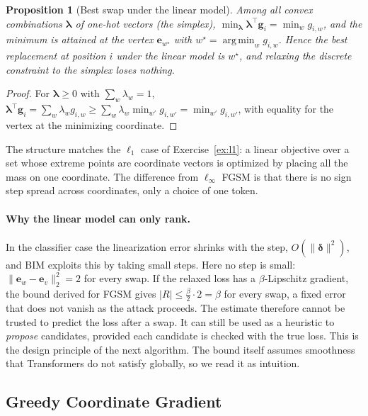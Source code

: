 \documentclass[10pt,a4paper]{extarticle}
\newtheorem{proposition}[theorem]{Proposition}
\theoremstyle{definition}
\newcommand{\bdelta}{\boldsymbol{\delta}}
\DeclareMathOperator*{\argmin}{arg\,min}
\begin{document}
\begin{proposition}[Best swap under the linear model]\label{prop:swap}
Among all convex combinations \(\boldsymbol{\lambda}\) of one-hot vectors (the simplex), \(\min_{\boldsymbol{\lambda}}\boldsymbol{\lambda}^\top\mathbf{g}_i=\min_w g_{i,w}\), and the minimum is attained at the vertex \(\mathbf{e}_{w^\star}\) with \(w^\star=\argmin_w g_{i,w}\). Hence the best replacement at position \(i\) under the linear model is \(w^\star\), and relaxing the discrete constraint to the simplex loses nothing.
\end{proposition}

\begin{proof}
For \(\boldsymbol{\lambda}\ge0\) with \(\sum_w\lambda_w=1\), \(\boldsymbol{\lambda}^\top\mathbf{g}_i=\sum_w\lambda_wg_{i,w}\ge\sum_w\lambda_w\min_{w'}g_{i,w'}=\min_{w'}g_{i,w'}\), with equality for the vertex at the minimizing coordinate.
\end{proof}

The structure matches the \(\ell_1\) case of Exercise~\ref{ex:l1}: a linear objective over a set whose extreme points are coordinate vectors is optimized by placing all the mass on one coordinate. The difference from \(\ell_\infty\) FGSM is that there is no sign step spread across coordinates, only a choice of one token.

\paragraph{Why the linear model can only rank.} In the classifier case the linearization error shrinks with the step, \(O(\|\bdelta\|^2)\), and BIM exploits this by taking small steps. Here no step is small: \(\|\mathbf{e}_w-\mathbf{e}_v\|_2^2=2\) for every swap. If the relaxed loss has a \(\beta\)-Lipschitz gradient, the bound derived for FGSM gives \(|R|\le\tfrac{\beta}{2}\cdot2=\beta\) for every swap, a fixed error that does not vanish as the attack proceeds. The estimate therefore cannot be trusted to predict the loss after a swap. It can still be used as a heuristic to \emph{propose} candidates, provided each candidate is checked with the true loss. This is the design principle of the next algorithm. The bound itself assumes smoothness that Transformers do not satisfy globally, so we read it as intuition.

\subsection{Greedy Coordinate Gradient}\label{sec:gcg}
\end{document}
